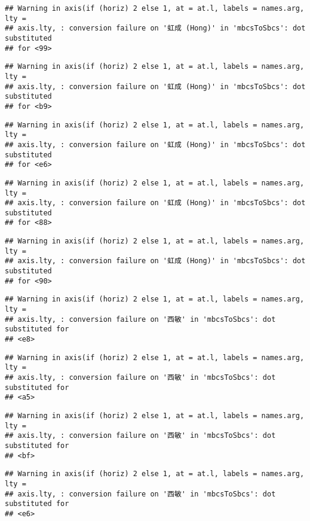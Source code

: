 \documentclass[
]{article}
\begin{document}
\begin{verbatim}
## Warning in axis(if (horiz) 2 else 1, at = at.l, labels = names.arg, lty =
## axis.lty, : conversion failure on '虹成 (Hong)' in 'mbcsToSbcs': dot substituted
## for <99>
\end{verbatim}

\begin{verbatim}
## Warning in axis(if (horiz) 2 else 1, at = at.l, labels = names.arg, lty =
## axis.lty, : conversion failure on '虹成 (Hong)' in 'mbcsToSbcs': dot substituted
## for <b9>
\end{verbatim}

\begin{verbatim}
## Warning in axis(if (horiz) 2 else 1, at = at.l, labels = names.arg, lty =
## axis.lty, : conversion failure on '虹成 (Hong)' in 'mbcsToSbcs': dot substituted
## for <e6>
\end{verbatim}

\begin{verbatim}
## Warning in axis(if (horiz) 2 else 1, at = at.l, labels = names.arg, lty =
## axis.lty, : conversion failure on '虹成 (Hong)' in 'mbcsToSbcs': dot substituted
## for <88>
\end{verbatim}

\begin{verbatim}
## Warning in axis(if (horiz) 2 else 1, at = at.l, labels = names.arg, lty =
## axis.lty, : conversion failure on '虹成 (Hong)' in 'mbcsToSbcs': dot substituted
## for <90>
\end{verbatim}

\begin{verbatim}
## Warning in axis(if (horiz) 2 else 1, at = at.l, labels = names.arg, lty =
## axis.lty, : conversion failure on '西敏' in 'mbcsToSbcs': dot substituted for
## <e8>
\end{verbatim}

\begin{verbatim}
## Warning in axis(if (horiz) 2 else 1, at = at.l, labels = names.arg, lty =
## axis.lty, : conversion failure on '西敏' in 'mbcsToSbcs': dot substituted for
## <a5>
\end{verbatim}

\begin{verbatim}
## Warning in axis(if (horiz) 2 else 1, at = at.l, labels = names.arg, lty =
## axis.lty, : conversion failure on '西敏' in 'mbcsToSbcs': dot substituted for
## <bf>
\end{verbatim}

\begin{verbatim}
## Warning in axis(if (horiz) 2 else 1, at = at.l, labels = names.arg, lty =
## axis.lty, : conversion failure on '西敏' in 'mbcsToSbcs': dot substituted for
## <e6>
\end{verbatim}
\end{document}

